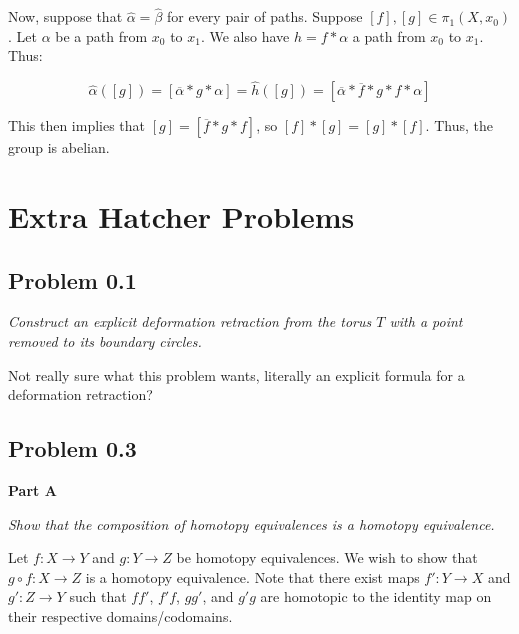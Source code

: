 \documentclass[10pt, oneside]{amsart}
\begin{document}
    Now, suppose that $\hat{\alpha} = \hat{\beta}$ for every pair of paths. Suppose $[f], [g] \in \pi_1(X, x_0)$. Let $\alpha$ be a path from $x_0$ to $x_1$. We also have $h = f * \alpha$ a path from
    $x_0$ to $x_1$. Thus:

    $$\hat{\alpha}([g]) = [\overline{\alpha} * g * \alpha] = \hat{h}([g]) = [\overline{\alpha} * \overline{f} * g * f * \alpha]$$

    This then implies that $[g] = [\overline{f} * g * f]$, so $[f] * [g] = [g] * [f]$. Thus, the group is abelian.

    \hrulefill

    \newpage

    \section{Extra Hatcher Problems}

    \hrulefill

    \subsection{Problem 0.1} \textit{Construct an explicit deformation retraction from the torus $T$ with a point removed to its boundary circles.}
    \newline

    Not really sure what this problem wants, literally an explicit formula for a deformation retraction?

    \newpage

    \hrulefill

    \subsection{Problem 0.3}

    \textbf{Part A}
    \newline

    \textit{Show that the composition of homotopy equivalences is a homotopy equivalence.}
    \newline

    Let $f : X \rightarrow Y$ and $g : Y \rightarrow Z$ be homotopy equivalences. We wish to show that $g \circ f : X \rightarrow Z$ is a homotopy equivalence. Note that
    there exist maps $f' : Y \rightarrow X$ and $g' : Z \rightarrow Y$ such that $f f'$, $f' f$, $g g'$, and $g' g$ are homotopic to the identity map on their respective
    domains/codomains.
    \newline
\end{document}
